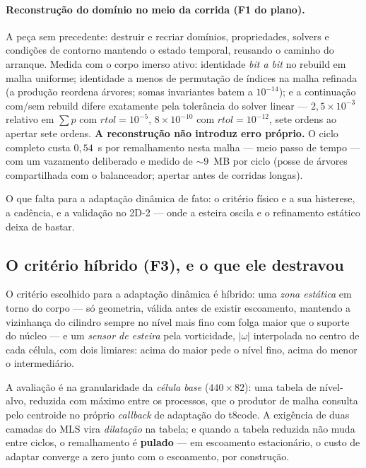 \paragraph{Reconstrução do domínio no meio da corrida (F1 do plano).} A peça
sem precedente: destruir e recriar domínios, propriedades, solvers e condições
de contorno mantendo o estado temporal, reusando o caminho do arranque. Medida
com o corpo imerso ativo: identidade \emph{bit a bit} no rebuild em malha
uniforme; identidade a menos de permutação de índices na malha refinada (a
produção reordena árvores; somas invariantes batem a $10^{-14}$); e a
continuação com/sem rebuild difere exatamente pela tolerância do solver linear
--- $2{,}5\times10^{-3}$ relativo em $\sum p$ com $rtol=10^{-5}$,
$8\times10^{-10}$ com $rtol=10^{-12}$, sete ordens ao apertar sete ordens.
\textbf{A reconstrução não introduz erro próprio.} O ciclo completo custa
$0{,}54$~s por remalhamento nesta malha --- meio passo de tempo --- com um
vazamento deliberado e medido de ${\sim}9$~MB por ciclo (posse de árvores
compartilhada com o balanceador; apertar antes de corridas longas).

O que falta para a adaptação dinâmica de fato: o critério físico e a sua
histerese, a cadência, e a validação no 2D-2 --- onde a esteira oscila e o
refinamento estático deixa de bastar.

\subsection{O critério híbrido (F3), e o que ele destravou}

O critério escolhido para a adaptação dinâmica é híbrido: uma \emph{zona
estática} em torno do corpo --- só geometria, válida antes de existir
escoamento, mantendo a vizinhança do cilindro sempre no nível mais fino com
folga maior que o suporte do núcleo --- e um \emph{sensor de esteira} pela
vorticidade, $|\omega|$ interpolada no centro de cada célula, com dois
limiares: acima do maior pede o nível fino, acima do menor o intermediário.

A avaliação é na granularidade da \emph{célula base} ($440 \times 82$): uma
tabela de nível-alvo, reduzida com máximo entre os processos, que o produtor de
malha consulta pelo centroide no próprio \emph{callback} de adaptação do
t8code. A exigência de duas camadas do MLS vira \emph{dilatação} na tabela; e
quando a tabela reduzida não muda entre ciclos, o remalhamento é
\textbf{pulado} --- em escoamento estacionário, o custo de adaptar converge a
zero junto com o escoamento, por construção.

